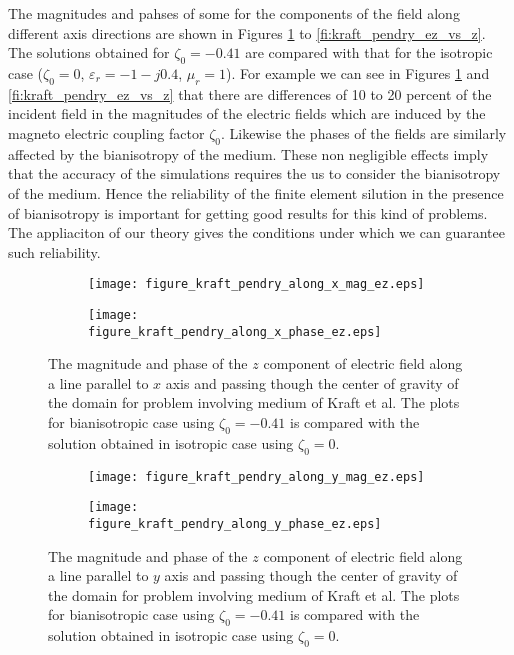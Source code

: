 The magnitudes and pahses of some for the components of the field 
along different axis directions are shown in 
Figures  \ref{fi:kraft_pendry_ez_vs_x} to \ref{fi:kraft_pendry_ez_vs_z}.
The solutions obtained for $\zeta_0 = -0.41$ are compared with that 
for the isotropic case ($\zeta_0 = 0$, $\varepsilon_r = -1 -j 0.4$, $\mu_r = 1$).
For example we can see in Figures \ref{fi:kraft_pendry_ez_vs_x} and \ref{fi:kraft_pendry_ez_vs_z}
that there are differences of 10 to 20 percent of the incident field in the 
magnitudes of the electric fields which are induced by the magneto electric coupling 
factor $\zeta_0$.
Likewise the phases of the fields are similarly affected by the bianisotropy of the medium.
These non negligible effects imply that the accuracy of the simulations requires the 
us to consider the bianisotropy of the medium.
Hence the reliability of the finite element silution in the presence of bianisotropy is important 
for getting good results for this kind of problems.
The appliaciton of our theory gives the conditions under which we can guarantee such reliability.


\begin{figure}[H]
\centering
\begin{subfigure}[b]{0.49\textwidth}
\texttt{[image: figure\_kraft\_pendry\_along\_x\_mag\_ez.eps]}
\end{subfigure}
%
\begin{subfigure}[b]{0.49\textwidth}
\centering
\texttt{[image: figure\_kraft\_pendry\_along\_x\_phase\_ez.eps]}
\end{subfigure}
\caption{The magnitude and phase of the $z$ component of electric field along a line parallel to $x$ axis 
and passing though the center of gravity of the domain for problem involving medium of Kraft et al. 
The plots for bianisotropic case  using $\zeta_0 = -0.41$ is compared with 
the solution obtained in isotropic case using $\zeta_0 = 0$.}
\label{fi:kraft_pendry_ez_vs_x}
\end{figure}

\begin{figure}[H]
\centering
\begin{subfigure}[b]{0.49\textwidth}
\texttt{[image: figure\_kraft\_pendry\_along\_y\_mag\_ez.eps]}
\end{subfigure}
%
\begin{subfigure}[b]{0.49\textwidth}
\centering
\texttt{[image: figure\_kraft\_pendry\_along\_y\_phase\_ez.eps]}
\end{subfigure}
\caption{The magnitude and phase of the $z$ component of electric field along a line parallel to $y$ axis 
and passing though the center of gravity of the domain  for problem involving medium of Kraft et al. 
The plots for bianisotropic case using $\zeta_0 = -0.41$ is compared with 
the solution obtained in isotropic case using $\zeta_0 = 0$. }
\label{fi:kraft_pendry_ez_vs_y}
\end{figure}

